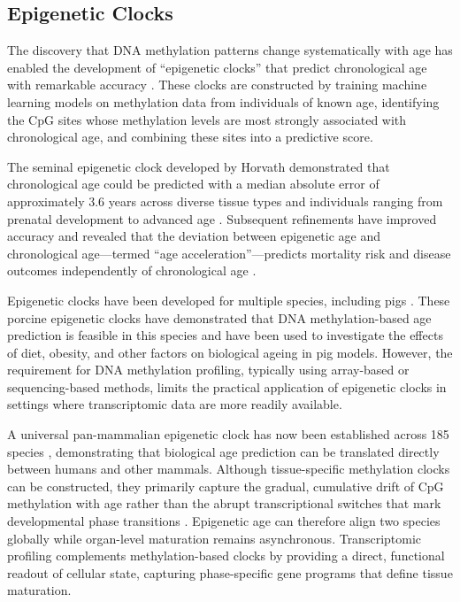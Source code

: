 \subsection{Epigenetic Clocks}

The discovery that DNA methylation patterns change systematically with age has enabled the development of ``epigenetic clocks'' that predict chronological age with remarkable accuracy \parencite{horvath_dna_2013, bi_ageing_clock_team_multi-tissue_2017, duan_epigenetic_2022}. These clocks are constructed by training machine learning models on methylation data from individuals of known age, identifying the CpG sites whose methylation levels are most strongly associated with chronological age, and combining these sites into a predictive score.

The seminal epigenetic clock developed by Horvath demonstrated that chronological age could be predicted with a median absolute error of approximately 3.6 years across diverse tissue types and individuals ranging from prenatal development to advanced age \parencite{horvath_dna_2013}. Subsequent refinements have improved accuracy and revealed that the deviation between epigenetic age and chronological age---termed ``age acceleration''---predicts mortality risk and disease outcomes independently of chronological age \parencite{teschendorff_epigenetic_2025}.

Epigenetic clocks have been developed for multiple species, including pigs \parencite{schachtschneider_epigenetic_2021}. These porcine epigenetic clocks have demonstrated that DNA methylation-based age prediction is feasible in this species and have been used to investigate the effects of diet, obesity, and other factors on biological ageing in pig models. However, the requirement for DNA methylation profiling, typically using array-based or sequencing-based methods, limits the practical application of epigenetic clocks in settings where transcriptomic data are more readily available.

A universal pan-mammalian epigenetic clock has now been established across 185 species \parencite{lu_universal_2023}, demonstrating that biological age prediction can be translated directly between humans and other mammals. Although tissue-specific methylation clocks can be constructed, they primarily capture the gradual, cumulative drift of CpG methylation with age rather than the abrupt transcriptional switches that mark developmental phase transitions \parencite{hoshino_synchrony_2019}. Epigenetic age can therefore align two species globally while organ-level maturation remains asynchronous. Transcriptomic profiling complements methylation-based clocks by providing a direct, functional readout of cellular state, capturing phase-specific gene programs that define tissue maturation.

